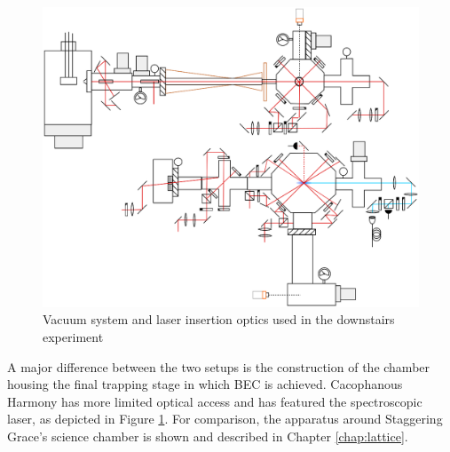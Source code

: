 	\begin{figure}
		\centering
		\includegraphics[width=\textwidth]{fig/apparatus/vacuum_schematic}
		\caption{Vacuum system and laser insertion optics used in the downstairs experiment}
		\label{fig:vacuum_diagram}
	\end{figure}


	A major difference between the two setups is the construction of the chamber housing the final trapping stage in which BEC is achieved. Cacophanous Harmony has more limited optical access and has featured the spectroscopic laser, as depicted in Figure \ref{fig:vacuum_diagram}. For comparison, the apparatus around Staggering Grace's science chamber is shown and described in Chapter \ref{chap:lattice}. 


